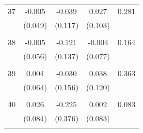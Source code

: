 \begin{tabular}{l*{1}{cccc}}
  37       & -0.005 & -0.039 & 0.027 & 0.281 \\
          & (0.049) & (0.117) & (0.103) & \\
 & & & &\\
  38       & -0.005 & -0.121 & -0.004 & 0.164 \\
          & (0.056) & (0.137) & (0.077) & \\
 & & & &\\
  39       & 0.004 & -0.030 & 0.038 & 0.363 \\
          & (0.064) & (0.156) & (0.120) & \\
 & & & &\\
  40       & 0.026 & -0.225 & 0.002 & 0.083 \\
          & (0.084) & (0.376) & (0.083) & \\
 & & & &\\
\hline\hline
\end{tabular}
